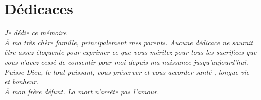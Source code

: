 \chapter{Dédicaces}
\textit{Je dédie ce mémoire
\\$ $\\À ma très chère famille, principalement mes parents. Aucune dédicace ne
saurait être assez éloquente pour exprimer ce que vous méritez pour tous
les sacrifices que vous n’avez cessé de consentir pour moi depuis ma
naissance jusqu’aujourd’hui.
\\Puisse Dieu, le tout puissant, vous préserver et vous accorder santé ,
longue vie et bonheur.
\\$ $\\À mon frère défunt. La mort n’arrête pas l’amour.}